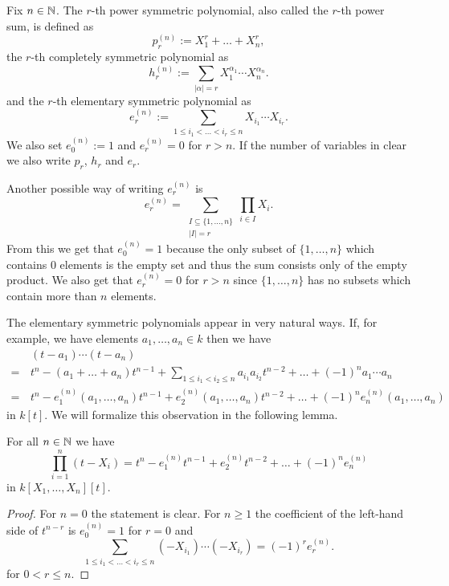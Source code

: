 \begin{defi}
 Fix $n \in \mathbb{N}$. The $r$-th power symmetric polynomial, also called the $r$-th power sum, is defined as
 \[
  p_r^{(n)} := X_1^r + \ldots + X_n^r,
 \]
 the $r$-th completely symmetric polynomial as
 \[
  h_r^{(n)} := \sum_{|\alpha|=r} X_1^{\alpha_1} \cdots X_n^{\alpha_n}.
 \]
 and the $r$-th elementary symmetric polynomial as
 \[
  e_r^{(n)} := \sum_{1 \leq i_1 < \ldots < i_r \leq n} X_{i_1} \cdots X_{i_r}.
 \]
 We also set $e_0^{(n)} := 1$ and $e_r^{(n)} = 0$ for $r > n$. If the number of variables in clear we also write $p_r$, $h_r$ and $e_r$.
\end{defi}

Another possible way of writing $e^{(n)}_r$ is
\[
 e^{(n)}_r = \sum_{\substack{I \subseteq \{1, \ldots, n\} \\ |I| = r}} \prod_{i \in I} X_i.
\]
From this we get that $e^{(n)}_0 = 1$ because the only subset of $\{1, \ldots, n\}$ which contains $0$ elements is the empty set and thus the sum consists only of the empty product. We also get that $e^{(n)}_r = 0$ for $r > n$ since $\{1, \ldots, n\}$ has no subsets which contain more than $n$ elements.

The elementary symmetric polynomials appear in very natural ways. If, for example, we have elements $a_1, \ldots, a_n \in k$ then we have
\begin{align*}
  &\, (t-a_1) \cdots (t-a_n) \\
 =&\, t^n - (a_1 + \ldots + a_n) t^{n-1} + \sum_{1 \leq i_1 < i_2 \leq n} a_{i_1} a_{i_2} t^{n-2} + \ldots + (-1)^n a_1 \cdots a_n \\ 
 =&\, t^n - e^{(n)}_1(a_1, \ldots, a_n) t^{n-1} + e^{(n)}_2(a_1, \ldots, a_n) t^{n-2} + \ldots + (-1)^n e^{(n)}_n(a_1, \ldots, a_n)
\end{align*}
in $k[t]$. We will formalize this observation in the following lemma.





\begin{lem}
 For all $n \in \mathbb{N}$ we have
 \[
  \prod_{i=1}^n (t-X_i) = t^n - e^{(n)}_1 t^{n-1} + e^{(n)}_2 t^{n-2} + \ldots + (-1)^n e^{(n)}_n
 \]
 in $k[X_1, \ldots, X_n][t]$.
\end{lem}
\begin{proof}
 For $n = 0$ the statement is clear. For $n \geq 1$ the coefficient of the left-hand side of $t^{n-r}$ is $e^{(n)}_0 = 1$ for $r = 0$ and
 \[
  \sum_{1 \leq i_1 < \ldots < i_r \leq n} (-X_{i_1}) \cdots (-X_{i_r}) = (-1)^r e^{(n)}_r.
 \]
 for $0 < r \leq n$.
\end{proof}


